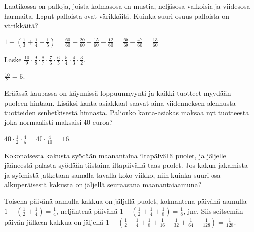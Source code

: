     \begin{tehtava} %
        Laatikossa on palloja, joista kolmasosa on mustia, neljäsosa
        valkoisia ja viidesosa harmaita. Loput palloista ovat värikkäitä.
        Kuinka suuri osuus palloista on värikkäitä?
        
        \begin{vastaus}
            $1-(\frac{1}{3}+\frac{1}{4}+\frac{1}{5})
            = \frac{60}{60}-\frac{20}{60}-\frac{15}{60}-\frac{12}{60}
            = \frac{60}{60}-\frac{47}{60}
            = \frac{13}{60}$
        \end{vastaus}
    \end{tehtava}
    
    \begin{tehtava}
        Laske 
        $\frac{10}{9}\cdot \frac{9}{8}\cdot \frac{8}{7}\cdot \frac{7}{6}\cdot \frac{6}{5}
            \cdot \frac{5}{4}\cdot \frac{4}{3}\cdot \frac{3}{2}$.
        
        \begin{vastaus}
            $\frac{10}{2}=5$.
        \end{vastaus}        
    \end{tehtava}
    
    \begin{tehtava}
    	Eräässä kaupassa on käynnissä loppuunmyynti ja kaikki tuotteet
        myydään puoleen hintaan. Lisäksi kanta-asiakkaat saavat aina
        viidenneksen alennusta tuotteiden senhetkisestä hinnasta.
    	Paljonko kanta-asiakas maksaa nyt tuotteesta joka normaalisti
        maksaisi 40 euroa?
    	\begin{vastaus}
    	$40\cdot \frac{1}{2} \cdot \frac{4}{5}=40\cdot \frac{4}{10}= 16$. 
    	\end{vastaus}
    \end{tehtava}
    
    \begin{tehtava}
        Kokonaisesta kakusta syödään maanantaina iltapäivällä puolet, ja jäljelle
        jääneestä palasta syödään tiistaina iltapäivällä taas puolet.
        Jos kakun jakamista ja syömistä jatketaan samalla tavalla koko viikko,
        niin kuinka suuri osa alkuperäisestä kakusta on
        jäljellä seuraavana maanantaiaamuna?
        
        \begin{vastaus}
            Toisena päivänä aamulla kakkua on jäljellä puolet, kolmantena
            päivänä aamulla
                $1-\left(\frac{1}{2} + \frac{1}{4}\right) = \frac{1}{4}$, 
            neljäntenä päivänä
                $1-\left(\frac{1}{2} + \frac{1}{4} + \frac{1}{8}\right)
                = \frac{1}{8}$, jne.
            Siis seitsemän päivän jälkeen kakkua on jäljellä
                $1-\left(\frac{1}{2} + \frac{1}{4} + \frac{1}{8} +
                \frac{1}{16} + \frac{1}{32} + \frac{1}{64} + \frac{1}{128}\right)
                = \frac{1}{128}$.  
        \end{vastaus}
    \end{tehtava}
